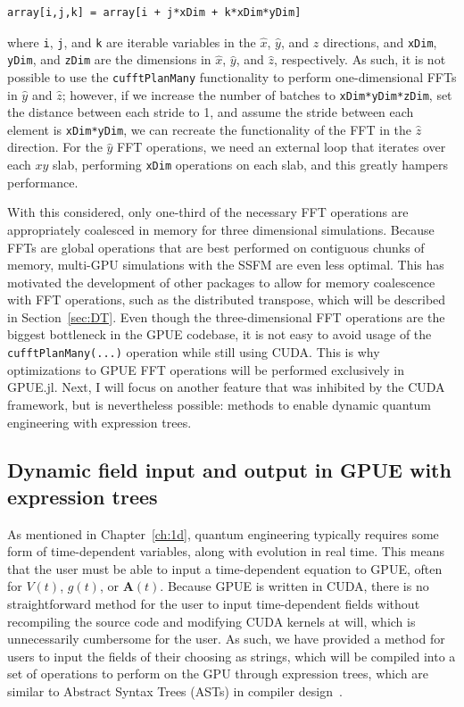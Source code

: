 \begin{lstlisting}
array[i,j,k] = array[i + j*xDim + k*xDim*yDim]
\end{lstlisting}

\noindent where \texttt{i}, \texttt{j}, and \texttt{k} are iterable variables in the $\hat x$, $\hat y$, and $\hat z$ directions, and \texttt{xDim}, \texttt{yDim}, and \texttt{zDim} are the dimensions in $\hat x$, $\hat y$, and $\hat z$, respectively.
As such, it is not possible to use the \texttt{cufftPlanMany} functionality to perform one-dimensional FFTs in $\hat y$ and $\hat z$; however, if we increase the number of batches to \texttt{xDim*yDim*zDim}, set the distance between each stride to 1, and assume the stride between each element is \texttt{xDim*yDim}, we can recreate the functionality of the FFT in the $\hat z$ direction.
For the $\hat y$ FFT operations, we need an external loop that iterates over each $xy$ slab, performing \texttt{xDim} operations on each slab, and this greatly hampers performance.


With this considered, only one-third of the necessary FFT operations are appropriately coalesced in memory for three dimensional simulations.
Because FFTs are global operations that are best performed on contiguous chunks of memory, multi-GPU simulations with the SSFM are even less optimal.
This has motivated the development of other packages to allow for memory coalescence with FFT operations, such as the distributed transpose, which will be described in Section~\ref{sec:DT}.
Even though the three-dimensional FFT operations are the biggest bottleneck in the GPUE codebase, it is not easy to avoid usage of the \texttt{cufftPlanMany(...)} operation while still using CUDA.
This is why optimizations to GPUE FFT operations will be performed exclusively in GPUE.jl.
Next, I will focus on another feature that was inhibited by the CUDA framework, but is nevertheless possible: methods to enable dynamic quantum engineering with expression trees.

\subsection{Dynamic field input and output in GPUE with expression trees}

\label{sec:expr_trees}
As mentioned in Chapter~\ref{ch:1d}, quantum engineering typically requires some form of time-dependent variables, along with evolution in real time.
This means that the user must be able to input a time-dependent equation to GPUE, often for $V(t)$, $g(t)$, or $\mathbf{A}(t)$.
Because GPUE is written in CUDA, there is no straightforward method for the user to input time-dependent fields without recompiling the source code and modifying CUDA kernels at will, which is unnecessarily cumbersome for the user.
As such, we have provided a method for users to input the fields of their choosing as strings, which will be compiled into a set of operations to perform on the GPU through expression trees, which are similar to Abstract Syntax Trees (ASTs) in compiler design~\cite{cohen1991, reyes2011}.

